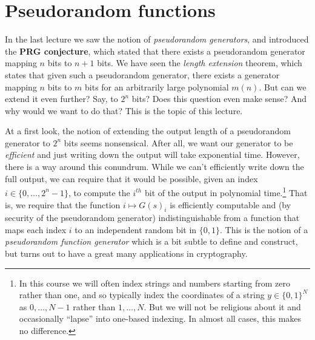 \chapter{Pseudorandom functions}\label{Pseudorandom-functions}

In the last lecture we saw the notion of \emph{pseudorandom generators},
and introduced the \textbf{PRG conjecture}, which stated that there
exists a pseudorandom generator mapping \(n\) bits to \(n+1\) bits. We
have seen the \emph{length extension} theorem, which states that given
such a pseudorandom generator, there exists a generator mapping \(n\)
bits to \(m\) bits for an arbitrarily large polynomial \(m(n)\). But can
we extend it even further? Say, to \(2^n\) bits? Does this question even
make sense? And why would we want to do that? This is the topic of this
lecture.

At a first look, the notion of extending the output length of a
pseudorandom generator to \(2^n\) bits seems nonsensical. After all, we
want our generator to be \emph{efficient} and just writing down the
output will take exponential time. However, there is a way around this
conundrum. While we can't efficiently write down the full output, we can
require that it would be possible, given an index
\(i\in \{0,\ldots,2^n-1\}\), to compute the \(i^{th}\) bit of the output
in polynomial time.\footnote{In this course we will often index strings
  and numbers starting from zero rather than one, and so typically index
  the coordinates of a string \(y\in \{0,1\}^N\) as \(0,\ldots,N-1\)
  rather than \(1,\ldots,N\). But we will not be religious about it and
  occasionally ``lapse'' into one-based indexing. In almost all cases,
  this makes no difference.} That is, we require that the function
\(i \mapsto G(s)_i\) is efficiently computable and (by security of the
pseudorandom generator) indistinguishable from a function that maps each
index \(i\) to an independent random bit in \(\{0,1\}\). This is the
notion of a \emph{pseudorandom function generator} which is a bit subtle
to define and construct, but turns out to have a great many applications
in cryptography.

\hypertarget{prfdef}{}

